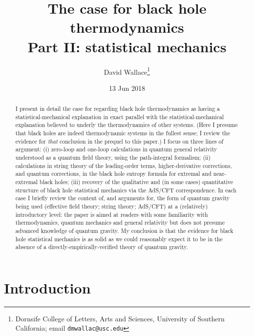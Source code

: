 \documentclass[12pt]{article}
\date{13 Jun 2018}
\begin{document}
\title{The case for black hole thermodynamics \\  Part II: statistical mechanics}
\author{David Wallace\thanks{Dornsife College of Letters, Arts and Sciences, University of Southern California; email \texttt{dmwallac@usc.edu}}}
\maketitle

\begin{abstract}
I present in detail the case for regarding black hole thermodynamics as having a statistical-mechanical explanation in exact parallel with the statistical-mechanical explanation believed to underly the thermodynamics of other systems. (Here I presume that black holes are indeed thermodynamic systems in the fullest sense; I review the evidence for \emph{that} conclusion in the prequel to this paper.) I focus on three lines of argument: (i) zero-loop and one-loop calculations in quantum general relativity understood as a quantum field theory, using the path-integral formalism; (ii) calculations in string theory of the leading-order terms, higher-derivative corrections, and quantum corrections, in the black hole entropy formula for extremal and near-extremal black holes; (iii) recovery of the qualitative and (in some cases) quantitative structure of black hole statistical mechanics via the AdS/CFT correspondence. In each case I briefly review the content of, and arguments for, the form of quantum gravity being used (effective field theory; string theory; AdS/CFT) at a (relatively) introductory level: the paper is aimed at readers with some familiarity with thermodynamics, quantum mechanics and general relativity but does not presume advanced knowledge of quantum gravity. My conclusion is that the evidence for black hole statistical mechanics is as solid as we could reasonably expect it to be in the absence of a directly-empirically-verified theory of quantum gravity.
\end{abstract}

\newpage

\section{Introduction}\label{introduction}
\end{document}
